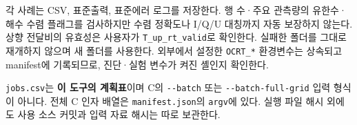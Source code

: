 각 사례는 CSV, 표준출력, 표준에러 로그를 저장한다. 행 수·주요 관측량의 유한수·해수 수렴 플래그를 검사하지만 수렴 정확도나 I/Q/U 대칭까지 자동 보장하지 않는다. 상향 전달비의 유효성은 사용자가 \texttt{T\_\allowbreak{}up\_\allowbreak{}rt\_\allowbreak{}valid}로 확인한다. 실패한 폴더를 그대로 재개하지 않으며 새 폴더를 사용한다. 외부에서 설정한 \texttt{OCRT\_\allowbreak{}*} 환경변수는 상속되고 manifest에 기록되므로, 진단·실험 변수가 켜진 셸인지 확인한다.

\texttt{jobs.\allowbreak{}csv}는 \textbf{이 도구의 계획표}이며 C의 \texttt{-\allowbreak{}-\allowbreak{}batch} 또는 \texttt{-\allowbreak{}-\allowbreak{}batch-\allowbreak{}full-\allowbreak{}grid} 입력 형식이 아니다. 전체 C 인자 배열은 \texttt{manifest.\allowbreak{}json}의 \texttt{argv}에 있다. 실행 파일 해시 외에도 사용 소스 커밋과 입력 자료 해시는 따로 보관한다.

